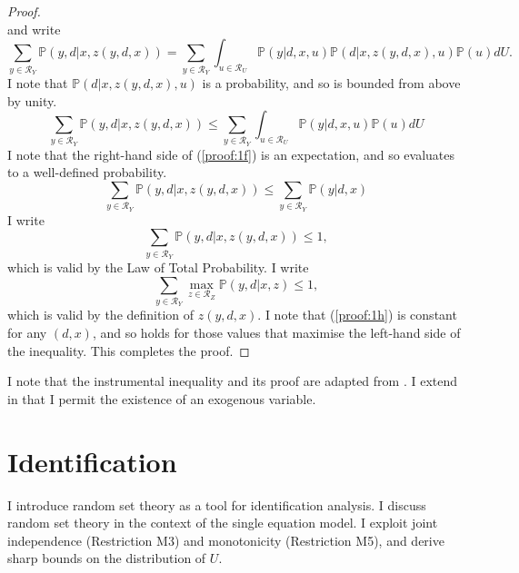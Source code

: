 \documentclass[10pt,a4paper,twoside]{article}
\numberwithin{equation}{section}
\begin{document}
\begin{proof}
\begin{equation}
\end{equation}
and write
\begin{equation}
\sum_{y\in\mathcal{R}_Y}\mathbb{P}(y,d|x,z(y,d,x))=\sum_{y\in\mathcal{R}_Y}\int_{u\in\mathcal{R}_U}\mathbb{P}(y|d,x,u)\mathbb{P}(d|x,z(y,d,x),u)\mathbb{P}(u)dU.\nonumber
\end{equation}
I note that $\mathbb{P}(d|x,z(y,d,x),u)$ is a probability, and so is bounded from above by unity.   
\begin{equation}
\sum_{y\in\mathcal{R}_Y}\mathbb{P}(y,d|x,z(y,d,x))\leq \sum_{y\in\mathcal{R}_Y}\int_{u\in\mathcal{R}_U}\mathbb{P}(y|d,x,u)\mathbb{P}(u)dU\label{proof:1f}
\end{equation}
I note that the right-hand side of (\ref{proof:1f}) is an expectation, and so evaluates to a well-defined probability.
\begin{equation}
\sum_{y\in\mathcal{R}_Y}\mathbb{P}(y,d|x,z(y,d,x))\leq \sum_{y\in\mathcal{R}_Y}\mathbb{P}(y|d,x)\label{proof:1g}
\end{equation}
I write
\begin{equation}
\sum_{y\in\mathcal{R}_Y}\mathbb{P}(y,d|x,z(y,d,x))\leq 1,\nonumber
\end{equation}
which is valid by the Law of Total Probability. I write 
\begin{equation}
\sum_{y\in\mathcal{R}_Y}\max_{z\in\mathcal{R}_Z}\mathbb{P}(y,d|x,z)\leq 1,\label{proof:1h}
\end{equation}
which is valid by the definition of $z(y,d,x)$. I note that (\ref{proof:1h}) is constant for any $(d,x)$, and so holds for those values that maximise the left-hand side of the inequality. This completes the proof.
\end{proof} 
\vspace{20pt} 
\noindent I note that the instrumental inequality and its proof are adapted from \cite{p95b}. I extend \cite{p95b} in that I permit the existence of an exogenous variable. 
\section{Identification}
I introduce random set theory \citep{book.molchanov} as a tool for identification analysis. I discuss random set theory in the context of the single equation model. I exploit joint independence (Restriction M3) and monotonicity (Restriction M5), and derive sharp bounds on the distribution of $U$.
\end{document}
